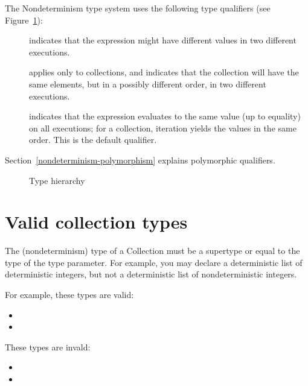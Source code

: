 The Nondeterminism type system uses the following type qualifiers (see Figure~\ref{fig-hierarchy}):
\begin{description}
\item[] indicates
  that the expression might have different values in two different executions.
\item[] applies only
  to collections, and indicates that the collection will have the same
  elements, but in a possibly different order, in two different executions.
\item[] indicates that
  the expression evaluates to the same value (up to equality) on all
  executions; for a collection, iteration yields the values in the same
  order.
  This is the default qualifier.
\end{description}

Section~\ref{nondeterminism-polymorphism} explains polymorphic qualifiers.

\begin{figure}
  \begin{center}
  \end{center}
\caption{Type hierarchy}
\label{fig-hierarchy}
\end{figure}


\section{Valid collection types\label{nondeterminism-collection-types}}

The (nondeterminism) type of a Collection must be a supertype or equal to
the type of the type parameter.  For example, you may declare a
deterministic list of deterministic integers, but not a deterministic
list of nondeterministic integers.

For example, these types are valid:
\begin{itemize}
    \item {}
    \item {}\code{>}
\end{itemize}

These types are invald:
  \begin{itemize}
    \item {}
    \item {}
  \end{itemize}

